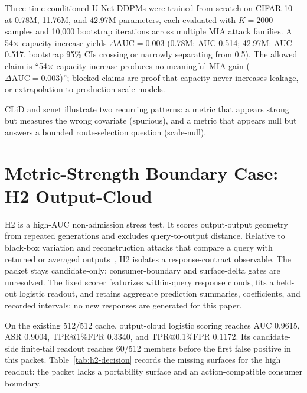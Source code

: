 \documentclass[10pt,conference]{IEEEtran}
\begin{document}
Three time-conditioned U-Net DDPMs were trained from scratch on CIFAR-10 at
0.78M, 11.76M, and 42.97M parameters, each evaluated with $K{=}2000$ samples
and 10,000 bootstrap iterations across multiple MIA attack families. A
54$\times$ capacity increase yields $\Delta\text{AUC}{=}0.003$
(0.78M: AUC 0.514; 42.97M: AUC 0.517, bootstrap 95\% CIs crossing or narrowly
separating from 0.5). The allowed claim is ``54$\times$ capacity increase
produces no meaningful MIA gain ($\Delta\text{AUC}{=}0.003$)''; blocked claims
are proof that capacity never increases leakage, or extrapolation to
production-scale models.

CLiD and scnet illustrate two recurring patterns: a metric that appears strong
but measures the wrong covariate (spurious), and a metric that appears null
but answers a bounded route-selection question (scale-null).

\section{Metric-Strength Boundary Case: H2 Output-Cloud}

H2 is a high-AUC non-admission stress test. It scores output-output geometry
from repeated generations and excludes query-to-output distance. Relative to
black-box variation and reconstruction attacks that
compare a query with returned or averaged outputs~\cite{rediffuse2025,reconstruction2025blackbox},
H2 isolates a response-contract observable. The packet stays candidate-only:
consumer-boundary and surface-delta gates are unresolved.
The fixed scorer featurizes within-query response clouds, fits a held-out
logistic readout, and retains aggregate prediction summaries, coefficients, and
recorded intervals; no new responses are generated for this paper.

On the existing 512/512 cache, output-cloud logistic scoring reaches AUC
0.9615, ASR 0.9004, TPR@1\%FPR 0.3340, and TPR@0.1\%FPR 0.1172. Its
candidate-side finite-tail readout reaches 60/512 members before the first
false positive in this packet. Table~\ref{tab:h2-decision} records the missing
surfaces for the high readout: the packet lacks a portability surface and an
action-compatible consumer boundary.
\end{document}
